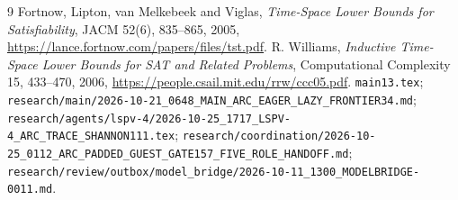 \documentclass[11pt]{article}
\begin{document}
\begin{thebibliography}{9}
 Fortnow, Lipton, van Melkebeek and Viglas, \emph{Time-Space Lower Bounds for Satisfiability}, JACM 52(6), 835--865, 2005, \url{https://lance.fortnow.com/papers/files/tst.pdf}.
 R. Williams, \emph{Inductive Time-Space Lower Bounds for SAT and Related Problems}, Computational Complexity 15, 433--470, 2006, \url{https://people.csail.mit.edu/rrw/ccc05.pdf}.
 \texttt{main13.tex}; \texttt{research/main/2026-10-21\_0648\_MAIN\_ARC\_EAGER\_LAZY\_FRONTIER34.md}; \texttt{research/agents/lspv-4/2026-10-25\_1717\_LSPV-4\_ARC\_TRACE\_SHANNON111.tex}; \texttt{research/coordination/2026-10-25\_0112\_ARC\_PADDED\_GUEST\_GATE157\_FIVE\_ROLE\_HANDOFF.md}; \texttt{research/review/outbox/model\_bridge/2026-10-11\_1300\_MODELBRIDGE-0011.md}.
\end{thebibliography}
\end{document}
